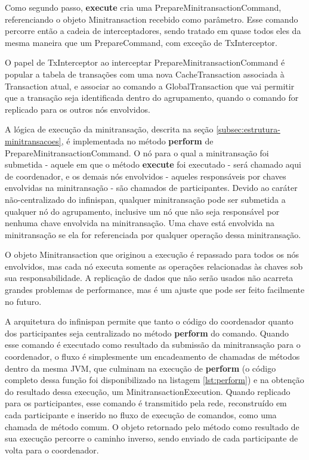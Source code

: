 \documentclass[11pt,twoside,a4paper]{book}
\begin{document}
Como segundo passo, \textbf{execute} cria uma PrepareMinitransactionCommand, referenciando o objeto Minitransaction recebido como parâmetro. Esse comando percorre então a cadeia de interceptadores, sendo tratado em quase todos eles da mesma maneira que um PrepareCommand, com exceção de TxInterceptor.

O papel de TxInterceptor ao interceptar PrepareMinitransactionCommand é popular a tabela de transações com uma nova CacheTransaction associada à Transaction atual, e associar ao comando a GlobalTransaction que vai permitir que a transação seja identificada dentro do agrupamento, quando o comando for replicado para os outros nós envolvidos.

A lógica de execução da minitransação, descrita na seção \ref{subsec:estrutura-minitransacoes}, é implementada no método \textbf{perform} de PrepareMinitransactionCommand. O nó para o qual a minitransação foi submetida - aquele em que o método \textbf{execute} foi executado - será chamado aqui de coordenador, e os demais nós envolvidos - aqueles responsáveis por chaves envolvidas na minitransação - são chamados de participantes. Devido ao caráter não-centralizado do infinispan, qualquer minitransação pode ser submetida a qualquer nó do agrupamento, inclusive um nó que não seja responsável por nenhuma chave envolvida na minitransação. Uma chave está envolvida na minitransação se ela for referenciada por qualquer operação dessa minitransação.

O objeto Minitransaction que originou a execução é repassado para todos os nós envolvidos, mas cada nó executa somente as operações relacionadas às chaves sob sua responsabilidade. A replicação de dados que não serão usados não acarreta grandes problemas de performance, mas é um ajuste que pode ser feito facilmente no futuro.

A arquitetura do infinispan permite que tanto o código do coordenador quanto dos participantes seja centralizado no método \textbf{perform} do comando. Quando esse comando é executado como resultado da submissão da minitransação para o coordenador, o fluxo é simplesmente um encadeamento de chamadas de métodos dentro da mesma JVM, que culminam na execução de \textbf{perform} (o código completo dessa função foi disponibilizado na listagem \ref{lst:perform}) e na obtenção do resultado dessa execução, um MinitransactionExecution. Quando replicado para os participantes, esse comando é transmitido pela rede, reconstruído em cada participante e inserido no fluxo de execução de comandos, como uma chamada de método comum. O objeto retornado pelo método como resultado de sua execução percorre o caminho inverso, sendo enviado de cada participante de volta para o coordenador.
\end{document}
